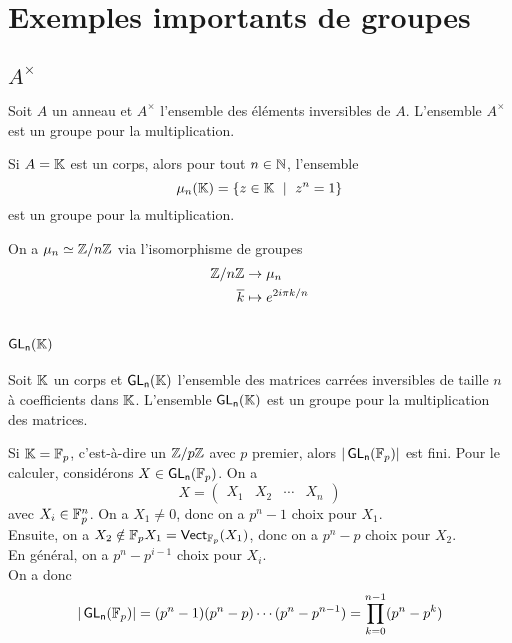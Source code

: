 \section{Exemples importants de groupes}\label{sec:exemples-importants-de-groupes}

\subsection*{\(A^\times\)}\label{subsec:ax}

Soit \(A\) un anneau et \(A^\times\) l'ensemble des éléments inversibles de \(A\).
L'ensemble \(A^\times\) est un groupe pour la multiplication.

Si \(A = \mathbb{K}\) est un corps, alors pour tout \(n\in\mathbb{N}\),
l'ensemble
\begin{equation*}
    \mu_n(\bb K) = \left\{z\in\bb K\ \mid\ z^n=1\right\}
\end{equation*}
est un groupe pour la multiplication.

\begin{remark}
    On a \(\mu_n \simeq \mathbb{Z}/n\mathbb{Z}\) via l'isomorphisme de groupes
    \begin{equation*}
        \begin{aligned}
            \mathbb{Z}/n\mathbb{Z} &\to \mu_n\\
            \overline{k} &\mapsto e^{2i\pi k/n}
        \end{aligned}
    \end{equation*}
\end{remark}

\subsection*{\(\operatorname{\mathsf{GL_{n}}}(\mathbb{K})\)}\label{subsec:glnk}

Soit \(\mathbb{K}\) un corps et \(\operatorname{\mathsf{GL_{n}}}(\mathbb{K})\) l'ensemble des matrices carrées inversibles
de taille \(n\) à coefficients dans \(\mathbb{K}\).
L'ensemble \(\operatorname{\mathsf{GL_{n}}}(\mathbb{K})\) est un groupe pour la multiplication des matrices.

\begin{remark}
    Si \(\mathbb{K} = \mathbb{F}_p\), c'est-à-dire un \(\mathbb{Z}/p\mathbb{Z}\) avec \(p\) premier,
    alors \(| \operatorname{\mathsf{GL_{n}}}(\mathbb{F}_p) |\) est fini. Pour le calculer, considérons
    \(X \in \operatorname{\mathsf{GL_{n}}}(\mathbb{F}_p)\). On a
    \begin{equation*}
        X = \begin{pmatrix}
            X_1 & X_2 & \cdots & X_n
        \end{pmatrix}
    \end{equation*}
    avec \(X_i \in \mathbb{F}_p^n\). On a \(X_1 \neq 0\), donc on a \(p^n - 1\) choix
    pour \(X_1\). \\
    Ensuite, on a \(X_2\notin \mathbb{F}_p X_1 = \operatorname{\mathsf{Vect}}_{\mathbb{F}_p}(X_1)\), donc on a
    \(p^n - p\) choix pour \(X_2\). \\
    En général, on a \(p^n - p^{i-1}\) choix pour \(X_i\). \\
    On a donc
    \begin{equation*}
        | \operatorname{\mathsf{GL_{n}}}(\mathbb{F}_p) | = (p^n - 1)(p^n - p)\cdots(p^n - p^{n-1}) = \prod_{k=0}^{n-1} (p^n - p^k)
    \end{equation*}
\end{remark}

